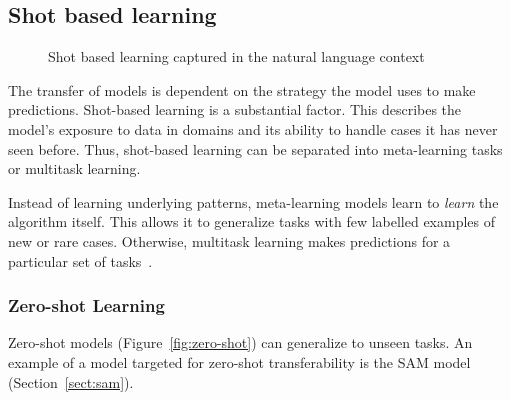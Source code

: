 \documentclass[12pt,twoside]{report}
\begin{document}
\subsection{Shot based learning}

\begin{figure}[H]
  \centering
  \caption{Shot based learning captured in the natural language context~\cite{openaishotbasedlearning}}
\end{figure}

The transfer of models is dependent on the strategy the model uses to make predictions. Shot-based learning is a substantial factor. This describes the model's exposure to data in domains and its ability to handle cases it has never seen before. Thus, shot-based learning can be separated into meta-learning tasks or multitask learning. 

Instead of learning underlying patterns, meta-learning models learn to \textit{learn} the algorithm itself. This allows it to generalize tasks with few labelled examples of new or rare cases. Otherwise, multitask learning makes predictions for a particular set of tasks~\cite{deep-learning-book}.

\subsubsection{Zero-shot Learning}\label{sect:zero-shot-learning}

Zero-shot models (Figure~\ref{fig:zero-shot}) can generalize to unseen tasks. An example of a model targeted for zero-shot transferability is the SAM model (Section~\ref{sect:sam}).
\end{document}
